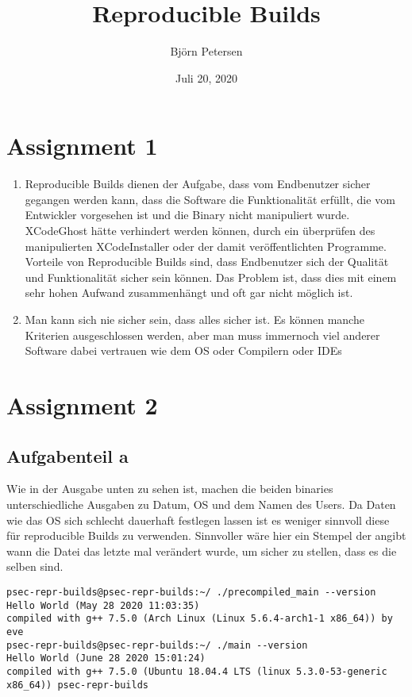 \documentclass[a4paper,12pt,
headsepline,           %
oneside,               %
pointlessnumbers,      %
bibtotoc,              %
BCOR15mm               %
]{scrbook}
\title{Reproducible Builds}
\date{Juli 20, 2020}
\author{Björn Petersen}
\begin{document}
\maketitle

\section*{Assignment 1}
\begin{enumerate}
    \item Reproducible Builds dienen der Aufgabe, dass vom Endbenutzer sicher gegangen werden kann, dass die Software die Funktionalität erfüllt, die vom Entwickler vorgesehen ist und die Binary nicht manipuliert wurde. XCodeGhost hätte verhindert werden können, durch ein überprüfen des manipulierten XCodeInstaller oder der damit veröffentlichten Programme. Vorteile von Reproducible Builds sind, dass Endbenutzer sich der Qualität und Funktionalität sicher sein können. Das Problem ist, dass dies mit einem sehr hohen Aufwand zusammenhängt und oft gar nicht möglich ist.
    \item Man kann sich nie sicher sein, dass alles sicher ist. Es können manche Kriterien ausgeschlossen werden, aber man muss immernoch viel anderer Software dabei vertrauen wie dem OS oder Compilern oder IDEs
\end{enumerate}

\section*{Assignment 2}
\subsection*{Aufgabenteil a}
Wie in der Ausgabe unten zu sehen ist, machen die beiden binaries unterschiedliche Ausgaben zu Datum, OS und dem Namen des Users. Da Daten wie das OS sich schlecht dauerhaft festlegen lassen ist es weniger sinnvoll diese für reproducible Builds zu verwenden.
Sinnvoller wäre hier ein Stempel der angibt wann die Datei das letzte mal verändert wurde, um sicher zu stellen, dass es die selben sind.

\begin{lstlisting}
psec-repr-builds@psec-repr-builds:~/ ./precompiled_main --version
Hello World (May 28 2020 11:03:35)
compiled with g++ 7.5.0 (Arch Linux (Linux 5.6.4-arch1-1 x86_64)) by eve
psec-repr-builds@psec-repr-builds:~/ ./main --version
Hello World (June 28 2020 15:01:24)
compiled with g++ 7.5.0 (Ubuntu 18.04.4 LTS (linux 5.3.0-53-generic x86_64)) psec-repr-builds
\end{lstlisting}
\end{document}
